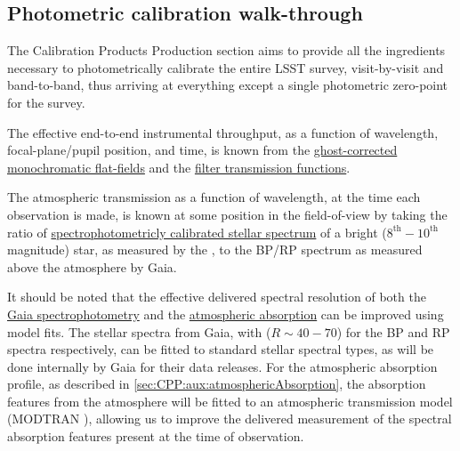 




\subsection{Photometric calibration walk-through}
\label{sec:CPP:walkthrough}
The Calibration Products Production section aims to provide all the ingredients necessary to photometrically calibrate the entire LSST survey, visit-by-visit and band-to-band, thus arriving at everything except a single photometric zero-point for the survey.

The effective end-to-end instrumental throughput, as a function of wavelength, focal-plane/pupil position, and time, is known from the \hyperref[sec:CPP:output:monoPhotoFlat]{ghost-corrected monochromatic flat-fields} and the \hyperref[sec:CPP:output:filterTransmission]{filter transmission functions}.

The atmospheric transmission as a function of wavelength, at the time each observation is made, is known at some position in the field-of-view by taking the ratio of \hyperref[sec:CPP:output:spectrophotometricStandards]{spectrophotometricly calibrated stellar spectrum} of a bright ($8^{\text{th}}-10^{\text{th}}$ magnitude) star, as measured by the \auxtelescope, to the BP/RP spectrum as measured above the atmosphere by Gaia. 


It should be noted that the effective delivered spectral resolution of both the \hyperref[sec:CPP:output:spectrophotometricStandards]{Gaia spectrophotometry} and the \hyperref[sec:CPP:aux:atmosphericAbsorption]{atmospheric absorption} can be improved using model fits. The stellar spectra from Gaia, with ($R \sim 40-70$) for the BP and RP spectra respectively\cite{GaiaSpecs}, can be fitted to standard stellar spectral types, as will be done internally by Gaia for their data releases\citep{2010MNRAS.403...96B}. For the atmospheric absorption profile, as described in \secsymbol\ref{sec:CPP:aux:atmosphericAbsorption}, the absorption features from the atmosphere will be fitted to an atmospheric transmission model (\eg MODTRAN \etc), allowing us to improve the delivered measurement of the spectral absorption features present at the time of observation.


